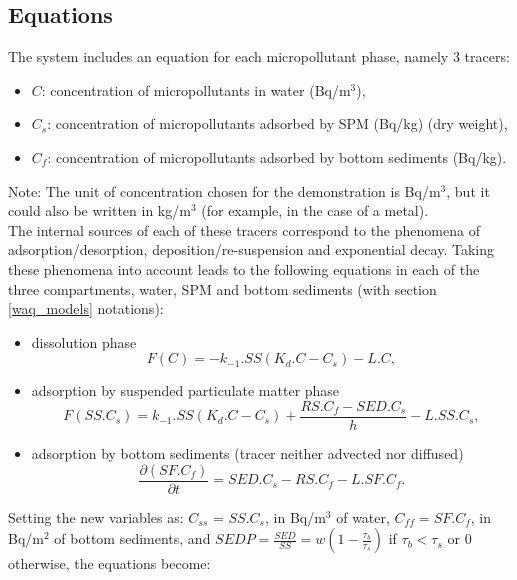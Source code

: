 \subsection{Equations}

The system includes an equation for each micropollutant phase, namely 3 tracers:

\begin{itemize}
\item $C$: concentration of micropollutants in water (Bq/m$^3$),
\item $C_s$: concentration of micropollutants adsorbed by SPM (Bq/kg) (dry weight),
\item $C_f$: concentration of micropollutants adsorbed by bottom sediments (Bq/kg).
\end{itemize}

Note: The unit of concentration chosen for the demonstration is Bq/m$^3$,
but it could also be written in kg/m$^3$ (for example, in the case of a metal).\\

The internal sources of each of these tracers correspond to the phenomena
of adsorption/desorption, deposition/re-suspension and exponential decay.
Taking these phenomena into account leads to the following equations
in each of the three compartments, water, SPM and bottom sediments
(with section \ref{waq_models} notations):

\begin{itemize}
\item dissolution phase
\begin{equation}
  F(C) = -k_{-1}.SS (K_d.C - C_s ) - L.C,
\end{equation}

\item adsorption by suspended particulate matter phase
\begin{equation}
  F(SS.C_s) = k_{-1}.SS (K_d.C - C_s ) + \frac{RS.C_f-SED.C_s}{h} - L.SS.C_s,
\end{equation}

\item adsorption by bottom sediments (tracer neither advected nor diffused)
\begin{equation}
  \frac{\partial (SF.C_f)}{\partial t} = SED.C_s - RS.C_f - L.SF.C_f.
\end{equation}

\end{itemize}

Setting the new variables as: $C_{ss}$  = $SS.C_s$, in Bq/m$^3$ of water,
$C_{ff} = SF.C_f$, in Bq/m$^2$ of bottom sediments,
and $SEDP = \frac{SED}{SS} = w \left (1-\frac{\tau_b}{\tau_s} \right)$
if $\tau_b < \tau_s$ or 0 otherwise, the equations become:\\

